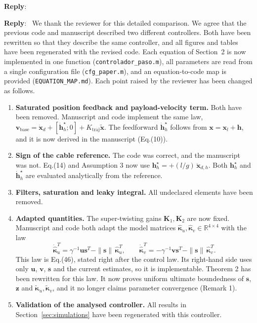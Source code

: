 \documentclass[11pt]{article}
\newcounter{reviewer}
\newcounter{point}[reviewer]
\newenvironment{reply}
   {\medskip \noindent \color{blue} \begin{sf}\textbf{Reply}:\  }
   {\medskip \par \end{sf}}
\begin{document}
\begin{reply}
\begin{reply}
We thank the reviewer for this detailed comparison. We agree that the previous code and manuscript described two different controllers. Both have been rewritten so that they describe the same controller, and all figures and tables have been regenerated with the revised code. Each equation of Section~2 is now implemented in one function (\texttt{controlador\_paso.m}), all parameters are read from a single configuration file (\texttt{cfg\_paper.m}), and an equation-to-code map is provided (\texttt{EQUATION\_MAP.md}). Each point raised by the reviewer has been changed as follows.

\begin{enumerate}
\item \textbf{Saturated position feedback and payload-velocity term.} Both have been removed. Manuscript and code implement the same law, $\mathbf{v}_{\mathrm{base}}=\dot{\mathbf{x}}_d+[\dot{\mathbf{h}}_h^\star;0]+K_{\mathrm{traj}}\tilde{\mathbf{x}}$. The feedforward $\dot{\mathbf{h}}_h^\star$ follows from $\mathbf{x}=\mathbf{x}_l+\mathbf{h}$, and it is now derived in the manuscript (Eq.(10)).

\item \textbf{Sign of the cable reference.} The code was correct, and the manuscript was not. Eq.(14) and Assumption 3 now use $\mathbf{h}_h^\star=+(l/g)\,\ddot{\mathbf{x}}_{d,h}$. Both $\mathbf{h}_h^\star$ and $\dot{\mathbf{h}}_h^\star$ are evaluated analytically from the reference.

\item \textbf{Filters, saturation and leaky integral.} All undeclared elements have been removed. 

\item \textbf{Adapted quantities.} The super-twisting gains $\mathbf{K}_1,\mathbf{K}_2$ are now fixed. Manuscript and code both adapt the model matrices $\hat{\boldsymbol{\kappa}}_u,\hat{\boldsymbol{\kappa}}_v\in\mathbb{R}^{4\times4}$ with the law
\begin{equation*}
\dot{\hat{\boldsymbol{\kappa}}}_u^{T}=\gamma^{-1}\mathbf{u}\mathbf{s}^{T}-\|\mathbf{s}\|\,\hat{\boldsymbol{\kappa}}_u^{T},\qquad
\dot{\hat{\boldsymbol{\kappa}}}_v^{T}=-\gamma^{-1}\mathbf{v}\mathbf{s}^{T}-\|\mathbf{s}\|\,\hat{\boldsymbol{\kappa}}_v^{T}.
\end{equation*}
This law is Eq.(46), stated right after the control law. Its right-hand side uses only $\mathbf{u}$, $\mathbf{v}$, $\mathbf{s}$ and the current estimates, so it is implementable. Theorem 2 has been rewritten for this law. It now proves uniform ultimate boundedness of $\mathbf{s}$, $\mathbf{z}$ and $\tilde{\boldsymbol{\kappa}}_u,\tilde{\boldsymbol{\kappa}}_v$, and it no longer claims parameter convergence (Remark 1).

\item \textbf{Validation of the analysed controller.} All results in Section~\ref{sec:simulations} have been regenerated with this controller.
\end{enumerate}
\end{reply}
\end{reply}
\end{document}
